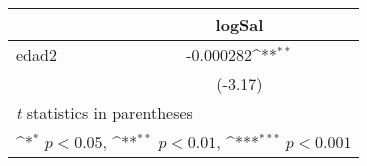 \newcommand\sym[1]{\ifmmode^{#1}\else\(^{#1}\)\fi}

\begin{tabular}{l*{1}{c}}
\hline\hline
            &\multicolumn{1}{c}{logSal}\\
\hline
edad2       &   -0.000282\sym{**} \\
            &     (-3.17)         \\
\hline
\multicolumn{2}{l}{\footnotesize \textit{t} statistics in parentheses}\\
\multicolumn{2}{l}{\footnotesize \sym{*} \(p<0.05\), \sym{**} \(p<0.01\), \sym{***} \(p<0.001\)}\\
\end{tabular}
